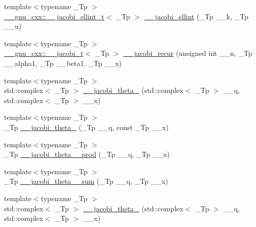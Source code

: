 \begin{DoxyCompactItemize}
\item 
{\footnotesize template$<$typename \+\_\+\+Tp $>$ }\\\hyperlink{struct____gnu__cxx_1_1____jacobi__ellint__t}{\+\_\+\+\_\+gnu\+\_\+cxx\+::\+\_\+\+\_\+jacobi\+\_\+ellint\+\_\+t}$<$ \+\_\+\+Tp $>$ \hyperlink{namespacestd_1_1____detail_a9530210ed172894f6a2e2bf4ef7fd47d}{\+\_\+\+\_\+jacobi\+\_\+ellint} (\+\_\+\+Tp \+\_\+\+\_\+k, \+\_\+\+Tp \+\_\+\+\_\+u)
\item 
{\footnotesize template$<$typename \+\_\+\+Tp $>$ }\\\hyperlink{struct____gnu__cxx_1_1____jacobi__t}{\+\_\+\+\_\+gnu\+\_\+cxx\+::\+\_\+\+\_\+jacobi\+\_\+t}$<$ \+\_\+\+Tp $>$ \hyperlink{namespacestd_1_1____detail_a35edf888e09012d7059e690507ef42ad}{\+\_\+\+\_\+jacobi\+\_\+recur} (unsigned int \+\_\+\+\_\+n, \+\_\+\+Tp \+\_\+\+\_\+alpha1, \+\_\+\+Tp \+\_\+\+\_\+beta1, \+\_\+\+Tp \+\_\+\+\_\+x)
\item 
{\footnotesize template$<$typename \+\_\+\+Tp $>$ }\\std\+::complex$<$ \+\_\+\+Tp $>$ \hyperlink{namespacestd_1_1____detail_aa6cd18ad2e630e4d412007bf2371fb34}{\+\_\+\+\_\+jacobi\+\_\+theta\+\_} (std\+::complex$<$ \+\_\+\+Tp $>$ \+\_\+\+\_\+q, std\+::complex$<$ \+\_\+\+Tp $>$ \+\_\+\+\_\+x)
\item 
{\footnotesize template$<$typename \+\_\+\+Tp $>$ }\\\+\_\+\+Tp \hyperlink{namespacestd_1_1____detail_af98af6bb3dd83f6a28c777d8fbaa5e51}{\+\_\+\+\_\+jacobi\+\_\+theta\+\_} (\+\_\+\+Tp \+\_\+\+\_\+q, const \+\_\+\+Tp \+\_\+\+\_\+x)
\item 
{\footnotesize template$<$typename \+\_\+\+Tp $>$ }\\\+\_\+\+Tp \hyperlink{namespacestd_1_1____detail_a6283a61803d2bc02eebf1d1a12b1bb52}{\+\_\+\+\_\+jacobi\+\_\+theta\+\_\+\_\+prod} (\+\_\+\+Tp \+\_\+\+\_\+q, \+\_\+\+Tp \+\_\+\+\_\+x)
\item 
{\footnotesize template$<$typename \+\_\+\+Tp $>$ }\\\+\_\+\+Tp \hyperlink{namespacestd_1_1____detail_adea964551a6650baebe13574d942bf50}{\+\_\+\+\_\+jacobi\+\_\+theta\+\_\+\_\+sum} (\+\_\+\+Tp \+\_\+\+\_\+q, \+\_\+\+Tp \+\_\+\+\_\+x)
\item 
{\footnotesize template$<$typename \+\_\+\+Tp $>$ }\\std\+::complex$<$ \+\_\+\+Tp $>$ \hyperlink{namespacestd_1_1____detail_aba908b579191a0c5f55be7db84ece5c5}{\+\_\+\+\_\+jacobi\+\_\+theta\+\_} (std\+::complex$<$ \+\_\+\+Tp $>$ \+\_\+\+\_\+q, std\+::complex$<$ \+\_\+\+Tp $>$ \+\_\+\+\_\+x)

\end{DoxyCompactItemize}
